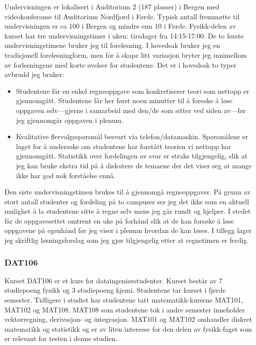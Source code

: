 \documentclass[a4paper,norsk,12pt]{article}
\begin{document}
Undervisningen er lokalisert i Auditorium 2 (187 plasser) i Bergen med videokonferanse til Auditorium Nordfjord i Førde. Typisk antall fremmøtte til undervisningen er ca 100 i Bergen og mindre enn 10 i Førde. Fysikk-delen av kurset har tre undervisningstimer i uken: tirsdager fra 14:15-17:00. De to første undervisningstimene bruker jeg til forelesning. I hovedsak bruker jeg en tradisjonell forelesningform, men for å skape litt variasjon bryter jeg innimellom av forlesningene med korte øvelser for studentene. Det er i hovedsak to typer avbrudd jeg bruker:
\begin{itemize}
\item
Studentene får en enkel regneoppgave som konkretiserer teori som nettopp er gjennomgått. Studentene får her først noen minutter til å forsøke å løse oppgaven selv---gjerne i samarbeid med den/de som sitter ved siden av---før jeg gjennomgår oppgaven i plenum.
\item
Kvalitative flervalgsspørsmål besvart via telefon/datamaskin. Spørs\-målene er laget for å undersøke om studentene har forstått teorien vi nettopp har gjennomgått. Statistikk over fordelingen av svar er straks tilgjengelig, slik at jeg kan bruke ekstra tid på å diskutere de temaene der det viser seg at mange ikke har god nok forståelse ennå.
\end{itemize}
Den siste undervisningstimen brukes til å gjennomgå regneoppgaver. På grunn av stort antall studenter og fordeling på to campuser ser jeg det ikke som en aktuell mulighet å la studentene sitte å regne selv mens jeg går rundt og hjelper. I stedet får de oppgavesettet omtrent en uke på forhånd slik at de kan forsøke å løse oppgavene på egenhånd før jeg viser i plenum hvordan de kan løses. I tillegg lager jeg skriftlig løsningsforslag som jeg gjør tilgjengelig etter at regnetimen er ferdig.

\subsubsection{DAT106}
Kurset DAT106 er et kurs for dataingeniørstudenter. Kurset består av 7 studiepoeng fysikk og 3 studiepoeng kjemi. Studentene tar kurset i fjerde semester. Tidligere i studiet har studentene tatt matematikk-kursene MAT101, MAT102 og MAT108. MAT108 som studentene tok i andre semester inneholder vektorregning, derivasjon- og integrasjon. MAT101 og MAT102 omhandler diskret matematikk og statistikk og er av liten interesse for den delen av fysikk-faget som er relevant for testen i denne studien.
\end{document}
